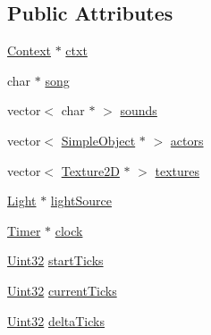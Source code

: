 \subsection*{Public Attributes}
\begin{DoxyCompactItemize}
\item 
\hyperlink{class_context}{Context} $\ast$ \hyperlink{class_base_level_abb9b05b9478873351f7dabb0dd0a0710}{ctxt}
\item 
char $\ast$ \hyperlink{class_base_level_a5b530914c467f446a16dc02b3832accc}{song}
\item 
vector$<$ char $\ast$ $>$ \hyperlink{class_base_level_a9d7bf47d2afa3ec76b5063983f731ade}{sounds}
\item 
vector$<$ \hyperlink{class_simple_object}{Simple\-Object} $\ast$ $>$ \hyperlink{class_base_level_afdb8847455ffc5ef1117e095f7b643f5}{actors}
\item 
vector$<$ \hyperlink{class_texture2_d}{Texture2\-D} $\ast$ $>$ \hyperlink{class_base_level_a60999fc099739ff1c592c23148bec541}{textures}
\item 
\hyperlink{class_light}{Light} $\ast$ \hyperlink{class_base_level_ac2ce7bd8b6bf7fbb16b95e89a244aaf4}{light\-Source}
\item 
\hyperlink{class_timer}{Timer} $\ast$ \hyperlink{class_base_level_ad687a06859d9aae04e2b836fe7538be3}{clock}
\item 
\hyperlink{_s_d_l__stdinc_8h_add440eff171ea5f55cb00c4a9ab8672d}{Uint32} \hyperlink{class_base_level_ab9eced0d307091b7ff45196f72ba4106}{start\-Ticks}
\item 
\hyperlink{_s_d_l__stdinc_8h_add440eff171ea5f55cb00c4a9ab8672d}{Uint32} \hyperlink{class_base_level_a754e65e0bf394364ae1afb6eebb117ac}{current\-Ticks}
\item 
\hyperlink{_s_d_l__stdinc_8h_add440eff171ea5f55cb00c4a9ab8672d}{Uint32} \hyperlink{class_base_level_a656e66f797ef9e923792f8bbba09bcf0}{delta\-Ticks}
\end{DoxyCompactItemize}


